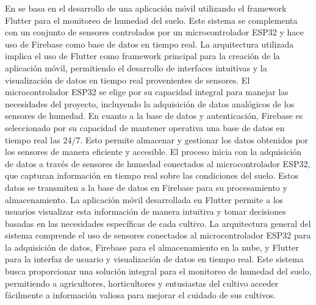 \bigbreak
En \cite{ramos_galindo_diseno_2023} se basa en el desarrollo de una aplicación móvil utilizando el framework Flutter para el monitoreo de humedad del suelo. Este sistema se complementa con un conjunto de sensores controlados por un microcontrolador ESP32 y hace uso de Firebase como base de datos en tiempo real. La arquitectura utilizada implica el uso de Flutter como framework principal para la creación de la aplicación móvil, permitiendo el desarrollo de interfaces intuitivas y la visualización de datos en tiempo real provenientes de sensores. El microcontrolador ESP32 se elige por su capacidad integral para manejar las necesidades del proyecto, incluyendo la adquisición de datos analógicos de los sensores de humedad. En cuanto a la base de datos y autenticación, Firebase es seleccionado por su capacidad de mantener operativa una base de datos en tiempo real las 24/7. Esto permite almacenar y gestionar los datos obtenidos por los sensores de manera eficiente y accesible. El proceso inicia con la adquisición de datos a través de sensores de humedad conectados al microcontrolador ESP32, que capturan información en tiempo real sobre las condiciones del suelo. Estos datos se transmiten a la base de datos en Firebase para su procesamiento y almacenamiento. La aplicación móvil desarrollada en Flutter permite a los usuarios visualizar esta información de manera intuitiva y tomar decisiones basadas en las necesidades específicas de cada cultivo. La arquitectura general del sistema comprende el uso de sensores conectados al microcontrolador ESP32 para la adquisición de datos, Firebase para el almacenamiento en la nube, y Flutter para la interfaz de usuario y visualización de datos en tiempo real. Este sistema busca proporcionar una solución integral para el monitoreo de humedad del suelo, permitiendo a agricultores, horticultores y entusiastas del cultivo acceder fácilmente a información valiosa para mejorar el cuidado de sus cultivos.
